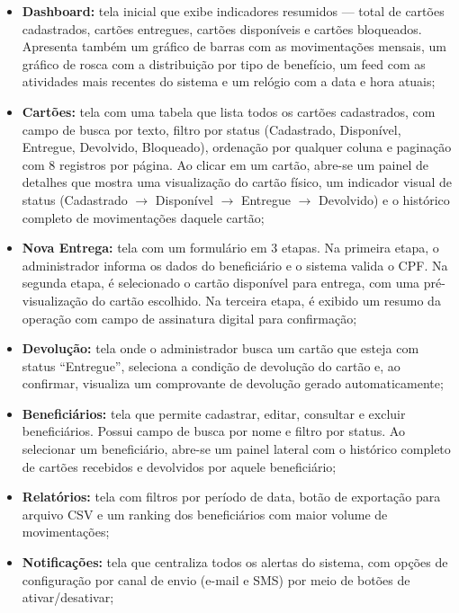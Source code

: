 \documentclass[
  article,
  a4paper,
  12pt,
  oneside,
  fleqn
]{abntex2}
\begin{document}
\begin{itemize}
    \item \textbf{Dashboard:} tela inicial que exibe indicadores resumidos --- total de cartões cadastrados, cartões entregues, cartões disponíveis e cartões bloqueados. Apresenta também um gráfico de barras com as movimentações mensais, um gráfico de rosca com a distribuição por tipo de benefício, um feed com as atividades mais recentes do sistema e um relógio com a data e hora atuais;

    \item \textbf{Cartões:} tela com uma tabela que lista todos os cartões cadastrados, com campo de busca por texto, filtro por status (Cadastrado, Disponível, Entregue, Devolvido, Bloqueado), ordenação por qualquer coluna e paginação com 8 registros por página. Ao clicar em um cartão, abre-se um painel de detalhes que mostra uma visualização do cartão físico, um indicador visual de status (Cadastrado $\rightarrow$ Disponível $\rightarrow$ Entregue $\rightarrow$ Devolvido) e o histórico completo de movimentações daquele cartão;

    \item \textbf{Nova Entrega:} tela com um formulário em 3 etapas. Na primeira etapa, o administrador informa os dados do beneficiário e o sistema valida o CPF. Na segunda etapa, é selecionado o cartão disponível para entrega, com uma pré-visualização do cartão escolhido. Na terceira etapa, é exibido um resumo da operação com campo de assinatura digital para confirmação;

    \item \textbf{Devolução:} tela onde o administrador busca um cartão que esteja com status ``Entregue'', seleciona a condição de devolução do cartão e, ao confirmar, visualiza um comprovante de devolução gerado automaticamente;

    \item \textbf{Beneficiários:} tela que permite cadastrar, editar, consultar e excluir beneficiários. Possui campo de busca por nome e filtro por status. Ao selecionar um beneficiário, abre-se um painel lateral com o histórico completo de cartões recebidos e devolvidos por aquele beneficiário;

    \item \textbf{Relatórios:} tela com filtros por período de data, botão de exportação para arquivo CSV e um ranking dos beneficiários com maior volume de movimentações;

    \item \textbf{Notificações:} tela que centraliza todos os alertas do sistema, com opções de configuração por canal de envio (e-mail e SMS) por meio de botões de ativar/desativar;


\end{itemize}
\end{document}
